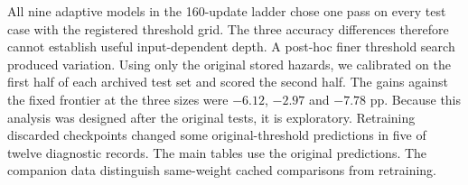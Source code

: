  All nine adaptive models in the 160-update ladder chose one pass on every test case with the registered threshold grid. The three accuracy differences therefore cannot establish useful input-dependent depth. A post-hoc finer threshold search produced variation. Using only the original stored hazards, we calibrated on the first half of each archived test set and scored the second half. The gains against the fixed frontier at the three sizes were $-6.12$, $-2.97$ and $-7.78$ pp. Because this analysis was designed after the original tests, it is exploratory. Retraining discarded checkpoints changed some original-threshold predictions in five of twelve diagnostic records. The main tables use the original predictions. The companion data distinguish same-weight cached comparisons from retraining.
